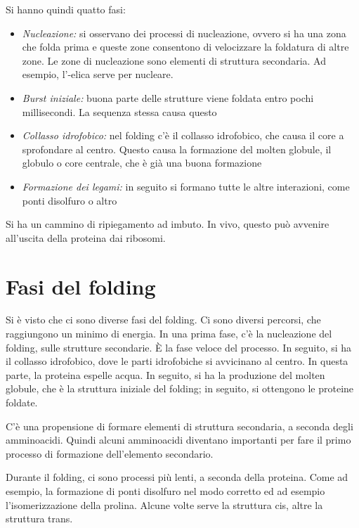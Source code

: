 Si hanno quindi quatto fasi:
\begin{itemize}
\item \emph{Nucleazione:} si osservano dei processi di nucleazione, ovvero si ha una zona che folda
prima e queste zone consentono di velocizzare la foldatura di altre
zone. Le zone di nucleazione sono elementi di struttura secondaria. Ad
esempio, l'\alpha-elica serve per nucleare.
\item \emph{Burst iniziale:} buona parte delle strutture viene foldata entro pochi
millisecondi. La sequenza stessa causa questo
\item \emph{Collasso idrofobico:} nel folding c'è il collasso idrofobico, che causa il core a sprofondare
al centro. Questo causa la formazione del molten globule, il globulo o core centrale,
che è già una buona formazione
\item \emph{Formazione dei legami:} in seguito si formano tutte le altre interazioni, come ponti disolfuro o
altro
\end{itemize}
Si ha un cammino di ripiegamento ad imbuto.
In vivo, questo può avvenire all'uscita della proteina dai ribosomi.


\section{Fasi del folding}

Si è visto che ci sono diverse fasi del folding. Ci sono diversi
percorsi, che raggiungono un minimo di energia. In una prima fase, c'è
la nucleazione del folding, sulle strutture secondarie. È la fase veloce
del processo.
In seguito, si ha il collasso idrofobico, dove le parti idrofobiche si
avvicinano al centro. In questa parte, la proteina espelle acqua.
In seguito, si ha la produzione del molten globule, che è la struttura
iniziale del folding; in seguito, si ottengono le proteine foldate.

C'è una propensione di formare elementi di struttura secondaria, a
seconda degli amminoacidi.
Quindi alcuni amminoacidi diventano importanti per fare il primo
processo di formazione dell'elemento secondario.


Durante il folding, ci sono processi più lenti, a seconda della
proteina. Come ad esempio, la formazione di ponti disolfuro nel modo
corretto ed ad esempio l'isomerizzazione della prolina.
Alcune volte serve la struttura cis, altre la struttura trans.


